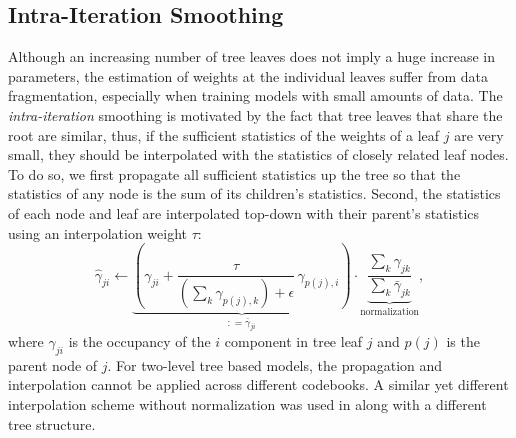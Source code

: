 \documentclass{article}
\begin{document}
\subsection{Intra-Iteration Smoothing}
Although an increasing number of tree leaves does not imply a huge increase in
parameters, the estimation of weights at the individual leaves suffer from data 
fragmentation, especially when training models with small amounts of data.
The {\em intra-iteration} smoothing is motivated by the fact that tree leaves
that share the root are similar, thus, if the sufficient statistics of the
weights of a leaf $j$ are very small, they should be interpolated with the 
statistics of closely related leaf nodes.
To do so, we first propagate all sufficient statistics up the tree so that the
statistics of any node is the sum of its children's statistics.
Second, the statistics of each node and leaf are interpolated top-down with 
their parent's statistics using an interpolation weight $\tau$:
\begin{equation} \label{eq:intra}
\hat\gamma_{ji} \leftarrow 
  \underbrace{\left(\gamma_{ji} + \frac{\tau}{\left( \sum_k \gamma_{p(j),k} \right) + \epsilon} \, \gamma_{p(j),i}\right)}_{\mathrel{\mathop{:}}= \bar\gamma_{ji}}
  \cdot 
  \underbrace{\frac{\sum_k \gamma_{jk}}{\sum_k \bar\gamma_{jk}}}_\text{normalization},
\end{equation}
where $\gamma_{ji}$ is the occupancy of the $i$ component in tree leaf $j$
and $p(j)$ is the parent node of $j$.
%
For two-level tree based models, the propagation and interpolation cannot
be applied across different codebooks. 
%
A similar yet different interpolation scheme without normalization was used in 
\cite{schukattalamazzini1994srf,schukattalamazzini1995as} along with a different
tree structure.

\end{document}
